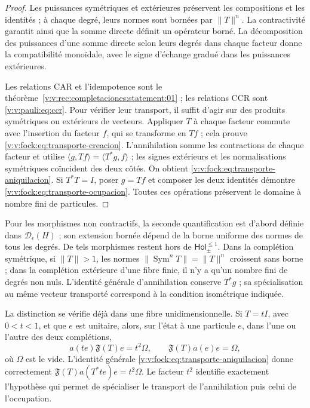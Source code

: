 \begin{proof}
Les puissances symétriques et extérieures préservent les compositions et les identités ;
à chaque degré, leurs normes sont bornées par \(\|T\|^n\). La contractivité
garantit ainsi que la somme directe définit un opérateur borné. La
décomposition des puissances d’une somme directe selon leurs degrés dans chaque
facteur donne la compatibilité monoïdale, avec le signe d’échange gradué
dans les puissances extérieures.

Les relations CAR et l’idempotence sont le
théorème~\ref{v:v:rec:completaciones:statement:01} ; les relations CCR sont
\eqref{v:v:pauli:eq:ccr}. Pour vérifier leur transport, il suffit d’agir sur
des produits symétriques ou extérieurs de vecteurs. Appliquer \(T\) à chaque facteur
commute avec l’insertion du facteur \(f\), qui se transforme en \(Tf\) ;
cela prouve \eqref{v:v:fock:eq:transporte-creacion}. L’annihilation somme les
contractions de chaque facteur et utilise
\(\langle g,Tf\rangle=\langle T^*g,f\rangle\) ; les signes extérieurs et
les normalisations symétriques coïncident des deux côtés. On obtient
\eqref{v:v:fock:eq:transporte-aniquilacion}. Si \(T^*T=I\), poser \(g=Tf\)
et composer les deux identités démontre
\eqref{v:v:fock:eq:transporte-ocupacion}. Toutes ces opérations préservent
le domaine à nombre fini de particules.
\end{proof}

Pour les morphismes non contractifs, la seconde quantification est d’abord définie
dans \(\mathcal D_\epsilon(H)\) ; son extension bornée dépend de la borne
uniforme des normes de tous les degrés. De tels morphismes restent hors
de \(\mathsf{Hol}_{\pm}^{\leq1}\). Dans la complétion symétrique, si
\(\|T\|>1\), les normes \(\|\operatorname{Sym}^nT\|=\|T\|^n\)
croissent sans borne ; dans la complétion extérieure d’une fibre finie, il n’y a
qu’un nombre fini de degrés non nuls. L’identité générale
d’annihilation conserve \(T^*g\) ; sa spécialisation au même vecteur
transporté correspond à la condition isométrique indiquée.

La distinction se vérifie déjà dans une fibre unidimensionnelle. Si
\(T=tI\), avec \(0<t<1\), et que \(e\) est unitaire, alors, sur l’état
à une particule \(e\), dans l’une ou l’autre des deux complétions,
\begin{equation}
 a(te)\mathfrak F(T)e=t^2\Omega,
 \qquad \mathfrak F(T)a(e)e=\Omega,
 \label{v:v:fock:eq:control-no-isometrico}
\end{equation}
où \(\Omega\) est le vide. L’identité générale
\eqref{v:v:fock:eq:transporte-aniquilacion} donne correctement
\(\mathfrak F(T)a(T^*te)e=t^2\Omega\). Le facteur \(t^2\) identifie
exactement l’hypothèse qui permet de spécialiser le transport de
l’annihilation puis celui de l’occupation.

